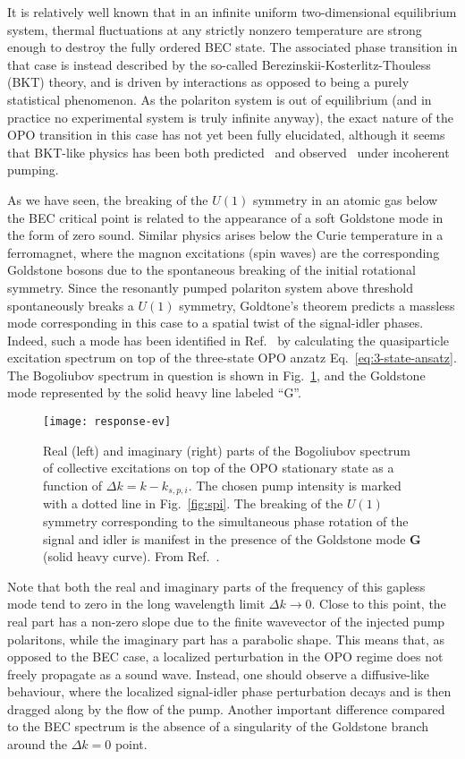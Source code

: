 It is relatively well known that in an infinite uniform
two-dimensional equilibrium system, thermal fluctuations at any
strictly nonzero temperature are strong enough to destroy the fully
ordered BEC state. The associated phase transition in that case is
instead described by the so-called Berezinskii-Kosterlitz-Thouless
(BKT) theory, and is driven by interactions as opposed to being a
purely statistical phenomenon. As the polariton system is out of
equilibrium (and in practice no experimental system is truly infinite
anyway), the exact nature of the OPO transition in this case has not
yet been fully elucidated, although it seems that BKT-like physics has
been both predicted~\cite{Szyma_ska_2006} and
observed~\cite{Roumpos2012} under incoherent pumping.

As we have seen, the breaking of the $U(1)$ symmetry in an atomic gas
below the BEC critical point is related to the appearance of a soft
Goldstone mode in the form of zero sound. Similar physics arises below
the Curie temperature in a ferromagnet, where the magnon excitations
(spin waves) are the corresponding Goldstone bosons due to the
spontaneous breaking of the initial rotational symmetry. Since the
resonantly pumped polariton system above threshold spontaneously
breaks a $U(1)$ symmetry, Goldtone's theorem predicts a massless mode
corresponding in this case to a spatial twist of the signal-idler
phases. Indeed, such a mode has been identified in
Ref.~\cite{Wouters_2007} by calculating the quasiparticle excitation
spectrum on top of the three-state OPO anzatz
Eq.~\eqref{eq:3-state-ansatz}. The Bogoliubov spectrum in question is
shown in Fig.~\ref{fig:goldstone}, and the Goldstone mode represented
by the solid heavy line labeled ``G''.
%
\begin{figure}[tb]\centering
  \texttt{[image: response-ev]}
  \caption{
    Real (left) and imaginary (right) parts of the Bogoliubov spectrum of collective excitations on top of the OPO stationary state as a function of $\Delta k = k - k_{s,p,i}$. The chosen pump intensity is marked with a dotted line in Fig.~\ref{fig:spi}. The breaking of the $U(1)$ symmetry corresponding to the simultaneous phase rotation of the signal and idler is manifest in the presence of the Goldstone mode \textbf{G} (solid heavy curve). From Ref.~\cite{Wouters_2007}.
  }\label{fig:goldstone}
\end{figure}
% 
Note that both the real and imaginary parts of the frequency of this
gapless mode tend to zero in the long wavelength limit
$\Delta k \rightarrow 0$. Close to this point, the real part has a
non-zero slope due to the finite wavevector of the injected pump
polaritons, while the imaginary part has a parabolic shape. This means
that, as opposed to the BEC case, a localized perturbation in the OPO
regime does not freely propagate as a sound wave. Instead, one should
observe a diffusive-like behaviour, where the localized signal-idler
phase perturbation decays and is then dragged along by the flow of the
pump. Another important difference compared to the BEC spectrum is the
absence of a singularity of the Goldstone branch around the
$\Delta k = 0$ point.

